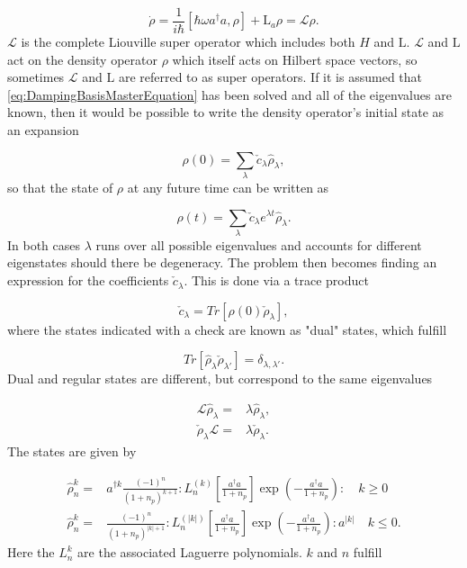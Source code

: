 \documentclass[12pt]{article}
\begin{document}
\begin{equation}\label{eq:DampingBasisMasterEquation}
    \dot{\rho} = \frac{1}{i\hbar}[\hbar \omega a^\dagger a,\rho] +\mathrm{L}_a\rho = \mathcal{L}\rho.
\end{equation} $\mathcal{L}$ is the complete Liouville super operator which includes both $H$ and $\mathrm{L}$. $\mathcal{L}$ and $\mathrm{L}$ act on the density operator $\rho$ which itself acts on Hilbert space vectors, so sometimes $\mathcal{L}$ and $\mathrm{L}$ are referred to as super operators. If it is assumed that \ref{eq:DampingBasisMasterEquation} has been solved and all of the eigenvalues are known, then it would be possible to write the density operator's initial state as an expansion

\begin{equation}
    \rho(0) = \sum_{\lambda} \check{c}_{\lambda} \hat{\rho}_{\lambda}, 
\end{equation} so that the state of $\rho$ at any future time can be written as

\begin{equation}
    \rho(t) = \sum_{\lambda} \check{c}_{\lambda} e^{\lambda t}\hat{\rho}_{\lambda}. 
\end{equation} In both cases $\lambda$ runs over all possible eigenvalues and accounts for different eigenstates should there be degeneracy. The problem then becomes finding an expression for the coefficients $\check{c}_{\lambda}$. This is done via a trace product

\begin{equation}
    \check{c}_\lambda = Tr[\rho(0)\check{\rho}_\lambda],
\end{equation} where the states indicated with a check are known as "dual" states, which fulfill

\begin{equation}
    Tr[\hat{\rho}_{\lambda} \check{\rho}_{\lambda'}] = \delta_{\lambda,\lambda'}. 
\end{equation} Dual and regular states are different, but correspond to the same eigenvalues

\begin{align}
    \mathcal{L}\hat{\rho}_\lambda =& \lambda \hat{\rho}_\lambda, \\
    \check{\rho}_\lambda\mathcal{L} =& \lambda \check{\rho}_\lambda.
\end{align} The states are given by

\begin{align}
  \hat{\rho}_n^k=& a^{\dagger k} \frac{(-1)^{n}}{(1+n_p)^{k+1}}: L_{n}^{(k)}\left[\frac{a^{\dagger} a}{1+n_p}\right] \exp \left(-\frac{a^{\dagger} a}{1+n_p}\right):  \quad k \geq 0 \nonumber\\
    \hat{\rho}_n^k=& \frac{(-1)^{n}}{(1+n_p)^{|k|+1}}: L_{n}^{(|k|)}\left[\frac{a^{\dagger} a}{1+n_p}\right] \exp \left(-\frac{a^{\dagger} a}{1+n_p}\right): a^{|k|}  \quad k \leq 0 . \nonumber
\end{align} Here the $L_n^k$ are the associated Laguerre polynomials. $k$ and $n$ fulfill
\end{document}
